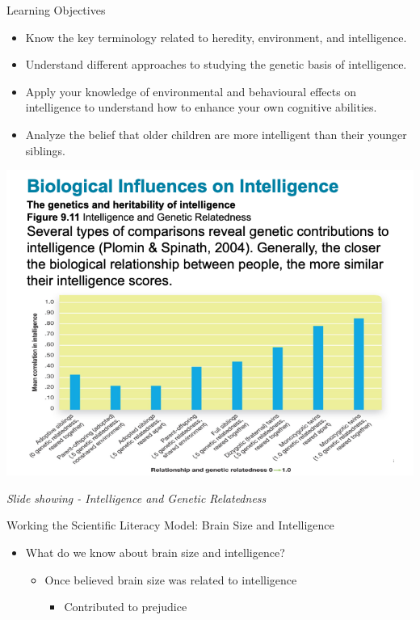 \documentclass[
]{book}
\providecommand{\tightlist}{%
  \setlength{\itemsep}{0pt}\setlength{\parskip}{0pt}}
\begin{document}
\begin{reflect}
Learning Objectives

\begin{itemize}
\tightlist
\item
  Know the key terminology related to heredity, environment, and intelligence.\\
\item
  Understand different approaches to studying the genetic basis of intelligence.\\
\item
  Apply your knowledge of environmental and behavioural effects on intelligence to understand how to enhance your own cognitive abilities.\\
\item
  Analyze the belief that older children are more intelligent than their younger siblings.
\end{itemize}

\includegraphics{assets/unit_2/slide_36.png}

\emph{Slide showing - Intelligence and Genetic Relatedness}

Working the Scientific Literacy Model: Brain Size and Intelligence

\begin{itemize}
\tightlist
\item
  What do we know about brain size and intelligence?

  \begin{itemize}
  \tightlist
  \item
    Once believed brain size was related to intelligence

    \begin{itemize}
    \tightlist
    \item
      Contributed to prejudice
    \end{itemize}
  \end{itemize}
\end{itemize}


\end{reflect}
\end{document}
